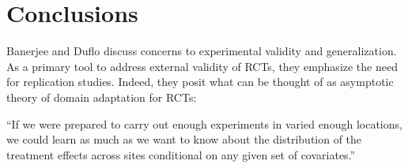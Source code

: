 \documentclass[a4paper,12pt]{article}
\begin{document}













\section{Conclusions}

Banerjee and Duflo \parencite*{Banerjee2014} discuss concerns to experimental validity and generalization. As a primary tool to address external validity of RCTs, they emphasize the need for replication studies. Indeed, they posit what can be thought of as asymptotic theory of domain adaptation for RCTs:

\begin{displayquote}
``If we were prepared to carry out enough experiments in varied enough locations, we could learn as much as we want to know about the distribution of the treatment effects across sites conditional on any given set of covariates.''
\end{displayquote}
\end{document}
